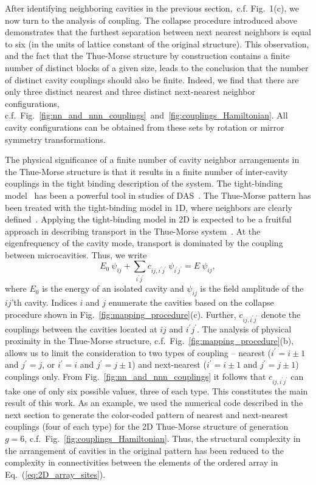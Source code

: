 After identifying neighboring cavities in the previous section,~c.f. Fig.~1(c), we now turn to the analysis of coupling. The collapse procedure introduced above demonstrates that the furthest separation between next nearest neighbors is equal to six (in the units of lattice constant of the original structure). This observation, and the fact that the Thue-Morse structure by construction contains a finite number of distinct blocks of a given size, leads to the conclusion that the number of distinct cavity couplings should also be finite. Indeed, we find that there are only three distinct nearest and three distinct next-nearest neighbor configurations, c.f.~Fig.~\ref{fig:nn_and_nnn_couplings}~and~\ref{fig:couplings_Hamiltonian}. All cavity configurations can be obtained from these sets by rotation or mirror symmetry transformations. 

The physical significance of a finite number of cavity neighbor arrangements in the Thue-Morse structure is that it results in a finite number of inter-cavity couplings in the tight binding description of the system. The tight-binding model~\cite{1954_Slater_tightBinding} has been a powerful tool in studies of DAS~\cite{2009_Barber}. The Thue-Morse pattern has been treated with the tight-binding model in 1D, where neighbors are clearly defined~\cite{1995_Carpena}. Applying the tight-binding model in 2D is expected to be a fruitful approach in describing transport in the Thue-Morse system~\cite{2011_Cao_DAS}. At the eigenfrequency of the cavity mode, transport is dominated by the coupling between microcavities. Thus, we write
\begin{equation}
E_0\ \psi_{ij}+\sum_{i^\prime j^\prime}c_{ij,i^\prime j^\prime}\ \psi_{i^\prime j^\prime}=E\ \psi_{ij},
\label{eq:2D_array_sites}
\end{equation}
where $E_0$ is the energy of an isolated cavity and $\psi_{ij}$ is the field amplitude of the $ij$'th cavity. Indices $i$ and $j$ enumerate the cavities based on the collapse procedure shown in Fig.~\ref{fig:mapping_procedure}(c). Further, $c_{ij,i^\prime j^\prime}$ denote the couplings between the cavities located at $ij$ and $i^\prime j^\prime$. The analysis of physical proximity in the Thue-Morse structure, c.f.~Fig.~\ref{fig:mapping_procedure}(b), allows us to limit the consideration to two types of coupling -- nearest ($i^\prime=i\pm1$ and $j^\prime=j$, or $i^\prime=i$ and $j^\prime=j\pm1$) and next-nearest ($i^\prime=i\pm1$ and $j^\prime=j\pm1$) couplings only. From Fig.~\ref{fig:nn_and_nnn_couplings} it follows that $c_{ij,i^\prime j^\prime}$ can take one of only six possible values, three of each type. This constitutes the main result of this work. As an example, we used the numerical code described in the next section to generate the color-coded pattern of nearest and next-nearest couplings (four of each type) for the 2D Thue-Morse structure of generation~$g=6$, c.f.~Fig.~\ref{fig:couplings_Hamiltonian}. Thus, the structural complexity in the arrangement of cavities in the original pattern has been reduced to the complexity in connectivities between the elements of the ordered array in Eq.~(\ref{eq:2D_array_sites}).

